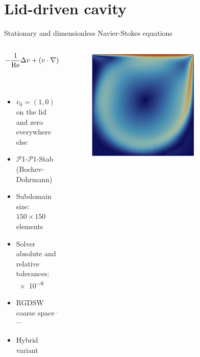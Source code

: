 \section{Lid-driven cavity}
\begin{frame}{Stationary and dimensionless Navier-Stokes equations}
	\vspace{-5mm}
	\begin{columns}
		\begin{column}{0.6\textwidth}%
			\begin{align*}
				-\frac{1}{\rm Re} \Delta v + (v \cdot \nabla)v + \nabla p & = 0 \;   & {\rm in}\; \Omega           \\
				{\rm div}(v)                                          & = 0 \;   & {\rm in} \; \Omega          \\
				v                                                     & = v_0 \; & {\rm on} \; \partial \Omega
			\end{align*}
			\vspace{-4mm}
			\begin{itemize}
				\item $v_0=(1,0)$ on the lid and zero everywhere else
                \item $\mathcal{P}$1-$\mathcal{P}$1-Stab (Bochev-Dohrmann) \footnotemark{}
				\item Subdomain size: $150\times 150$ elements
				\item Solver absolute and relative tolerances: \num{e-6}
        \item RGDSW coarse space \footnotemark[5]$^,$\footnotemark[6]$^,$\footnotemark[7]$^,$\footnotemark[8]$^,$\footnotemark[9]
                \item Hybrid variant
			\end{itemize}
		\end{column}
		\begin{column}{0.4\textwidth}
			\begin{figure}
				\centering
				\includegraphics[width=0.7\textwidth]{images/ldc.png}

\end{figure}
\end{column}
\end{columns}
\end{frame}

